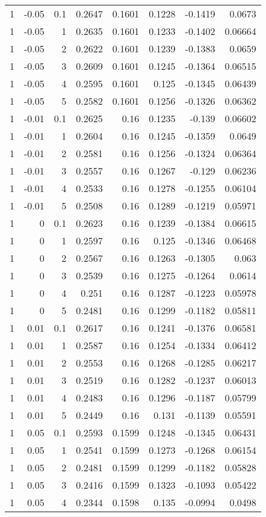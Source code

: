\documentclass{amsart}
\theoremstyle{plain}
\numberwithin{equation}{section}
\begin{document}
\begin{longtable}{r | r | r | r | r | r | r | r}
1 & -0.05 & 0.1 & 0.2647 & 0.1601 & 0.1228 & -0.1419 & 0.0673 \\
1 & -0.05 & 1 & 0.2635 & 0.1601 & 0.1233 & -0.1402 & 0.06664 \\
1 & -0.05 & 2 & 0.2622 & 0.1601 & 0.1239 & -0.1383 & 0.0659 \\
1 & -0.05 & 3 & 0.2609 & 0.1601 & 0.1245 & -0.1364 & 0.06515 \\
1 & -0.05 & 4 & 0.2595 & 0.1601 & 0.125 & -0.1345 & 0.06439 \\
1 & -0.05 & 5 & 0.2582 & 0.1601 & 0.1256 & -0.1326 & 0.06362 \\ \hline
1 & -0.01 & 0.1 & 0.2625 & 0.16 & 0.1235 & -0.139 & 0.06602 \\
1 & -0.01 & 1 & 0.2604 & 0.16 & 0.1245 & -0.1359 & 0.0649 \\
1 & -0.01 & 2 & 0.2581 & 0.16 & 0.1256 & -0.1324 & 0.06364 \\
1 & -0.01 & 3 & 0.2557 & 0.16 & 0.1267 & -0.129 & 0.06236 \\
1 & -0.01 & 4 & 0.2533 & 0.16 & 0.1278 & -0.1255 & 0.06104 \\
1 & -0.01 & 5 & 0.2508 & 0.16 & 0.1289 & -0.1219 & 0.05971 \\ \hline
1 & 0 & 0.1 & 0.2623 & 0.16 & 0.1239 & -0.1384 & 0.06615 \\
1 & 0 & 1 & 0.2597 & 0.16 & 0.125 & -0.1346 & 0.06468 \\
1 & 0 & 2 & 0.2567 & 0.16 & 0.1263 & -0.1305 & 0.063 \\
1 & 0 & 3 & 0.2539 & 0.16 & 0.1275 & -0.1264 & 0.0614 \\
1 & 0 & 4 & 0.251 & 0.16 & 0.1287 & -0.1223 & 0.05978 \\
1 & 0 & 5 & 0.2481 & 0.16 & 0.1299 & -0.1182 & 0.05811 \\ \hline
1 & 0.01 & 0.1 & 0.2617 & 0.16 & 0.1241 & -0.1376 & 0.06581 \\
1 & 0.01 & 1 & 0.2587 & 0.16 & 0.1254 & -0.1334 & 0.06412 \\
1 & 0.01 & 2 & 0.2553 & 0.16 & 0.1268 & -0.1285 & 0.06217 \\
1 & 0.01 & 3 & 0.2519 & 0.16 & 0.1282 & -0.1237 & 0.06013 \\
1 & 0.01 & 4 & 0.2483 & 0.16 & 0.1296 & -0.1187 & 0.05799 \\
1 & 0.01 & 5 & 0.2449 & 0.16 & 0.131 & -0.1139 & 0.05591 \\ \hline
1 & 0.05 & 0.1 & 0.2593 & 0.1599 & 0.1248 & -0.1345 & 0.06431 \\
1 & 0.05 & 1 & 0.2541 & 0.1599 & 0.1273 & -0.1268 & 0.06154 \\
1 & 0.05 & 2 & 0.2481 & 0.1599 & 0.1299 & -0.1182 & 0.05828 \\
1 & 0.05 & 3 & 0.2416 & 0.1599 & 0.1323 & -0.1093 & 0.05422 \\
1 & 0.05 & 4 & 0.2344 & 0.1598 & 0.135 & -0.0994 & 0.0498
\label{skewtable}
\end{longtable}
\end{document}
